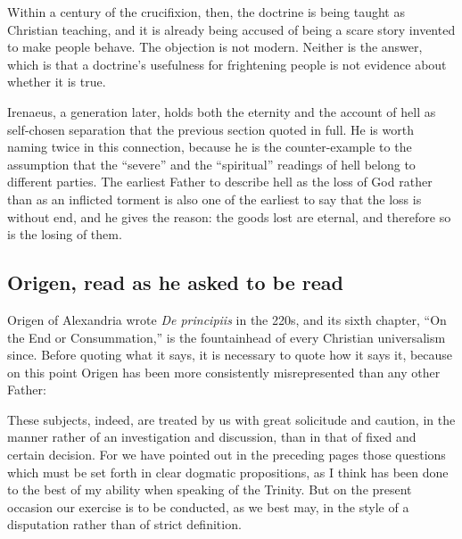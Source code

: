 Within a century of the crucifixion, then, the doctrine is being taught as Christian teaching, and it is already being accused of being a scare story invented to make people behave. The objection is not modern. Neither is the answer, which is that a doctrine's usefulness for frightening people is not evidence about whether it is true.

Irenaeus, a generation later, holds both the eternity and the account of hell as self-chosen separation that the previous section quoted in full. He is worth naming twice in this connection, because he is the counter-example to the assumption that the ``severe'' and the ``spiritual'' readings of hell belong to different parties. The earliest Father to describe hell as the loss of God rather than as an inflicted torment is also one of the earliest to say that the loss is without end, and he gives the reason: the goods lost are eternal, and therefore so is the losing of them.

\subsection{Origen, read as he asked to be read}

Origen of Alexandria wrote \emph{De principiis} in the 220s, and its sixth chapter, ``On the End or Consummation,'' is the fountainhead of every Christian universalism since. Before quoting what it says, it is necessary to quote how it says it, because on this point Origen has been more consistently misrepresented than any other Father:

\begin{studyframe}
These subjects, indeed, are treated by us with great solicitude and caution, in the manner rather of an investigation and discussion, than in that of fixed and certain decision. For we have pointed out in the preceding pages those questions which must be set forth in clear dogmatic propositions, as I think has been done to the best of my ability when speaking of the Trinity. But on the present occasion our exercise is to be conducted, as we best may, in the style of a disputation rather than of strict definition.
\end{studyframe}

